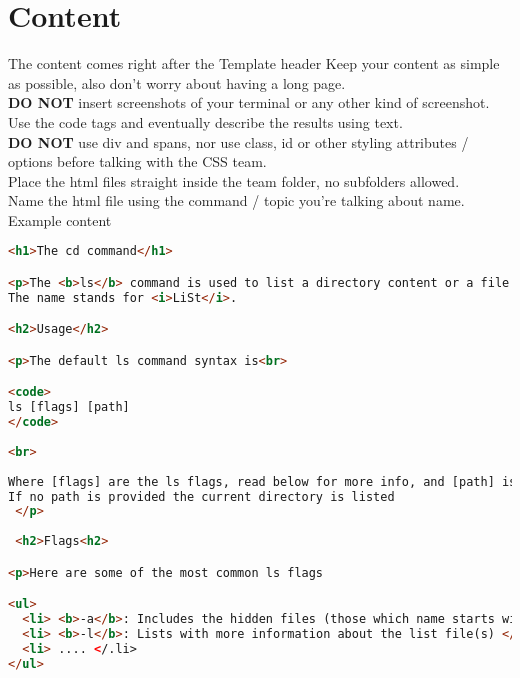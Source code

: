 \documentclass[hidelinks,12pt,a4paper,numbers=enddot]{scrartcl}
\begin{document}
\section{Content}

The content comes right after the Template header
Keep your content as simple as possible, also don't worry about having a long page.\\

\textbf{DO NOT} insert screenshots of your terminal or any other kind of screenshot. Use
the code tags and eventually describe the results using text.\\

\textbf{DO NOT} use div and spans, nor use class, id or other styling attributes / options before
talking with the CSS team. \\

Place the html files straight inside the team folder, no subfolders allowed.\\
Name the html file using the command / topic you're talking about name.\\


Example content

\begin{lstlisting}[language=html]
<h1>The cd command</h1>

<p>The <b>ls</b> command is used to list a directory content or a file.<br>
The name stands for <i>LiSt</i>.

<h2>Usage</h2>

<p>The default ls command syntax is<br>

<code>
ls [flags] [path]
</code>
 
<br>
 
Where [flags] are the ls flags, read below for more info, and [path] is the (optional) path (absolute or relative).<br>
If no path is provided the current directory is listed
 </p>
 
 <h2>Flags<h2>

<p>Here are some of the most common ls flags

<ul>
  <li> <b>-a</b>: Includes the hidden files (those which name starts with ".")
  <li> <b>-l</b>: Lists with more information about the list file(s) </li>
  <li> .... </.li>
</ul>
\end{lstlisting}
\end{document}

